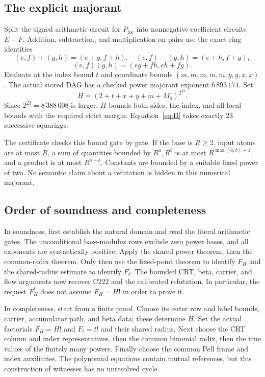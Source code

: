 \documentclass[11pt,letterpaper]{article}
\theoremstyle{definition}
\theoremstyle{remark}
\begin{document}
\subsection{The explicit majorant}

Split the signed arithmetic circuit for $P_{\mathrm{loc}}$ into
nonnegative-coefficient circuits $E-F$. Addition, subtraction, and
multiplication on pairs use the exact ring identities
\[
 (e,f)+(g,h)=(e+g,f+h),\quad
 (e,f)-(g,h)=(e+h,f+g),
\]
\[
                    (e,f)(g,h)=(eg+fh,eh+fg).
\]
Evaluate at the index bound $t$ and coordinate bounds
$(m,m,m,m,m,y,y,x,x)$. The actual stored DAG has a checked power
majorant exponent $6\,893\,174$. Set
\begin{equation}\label{eq:H}
 H=(2+t+x+y+m+M_0)^{2^{23}}.
\end{equation}
Since $2^{23}=8\,388\,608$ is larger, $H$ bounds both sides, the
index, and all local bounds with the required strict margin.
Equation~\eqref{eq:H} takes exactly 23 successive squarings.

The certificate checks this bound gate by gate. If the base is
$R\ge2$, input atoms are at most $R$, a sum of quantities bounded by
$R^a,R^b$ is at most $R^{\max(a,b)+1}$, and a product is at most
$R^{a+b}$. Constants are bounded by a suitable fixed power of two.
No semantic claim about a refutation is hidden in this numerical
majorant.



\subsection{Order of soundness and completeness}

In soundness, first establish the natural domain and read the literal
arithmetic gates. The unconditional base-modulus rows exclude zero power
bases, and all exponents are syntactically positive. Apply the shared
power theorem, then the common-radix theorem. Only then use the
fixed-point theorem to identify $F_H$ and the shared-radius estimate to
identify $F_t$. The bounded CRT, beta, carrier, and flow arguments now
recover C222 and the calibrated refutation. In particular, the request
$F_H^t$ does not assume $F_H=H!$ in order to prove it.

In completeness, start from a finite proof. Choose its outer row and
label bounds, carrier, accumulator path, and beta data; these determine
$H$. Set the actual factorials $F_H=H!$ and $F_t=t!$ and their shared
radius. Next choose the CRT column and index representatives, then the
common binomial radix, then the true values of the finitely many powers.
Finally choose the common Pell frame and index auxiliaries. The polynomial
equations contain mutual references, but this construction of witnesses
has no unresolved cycle.
\end{document}
